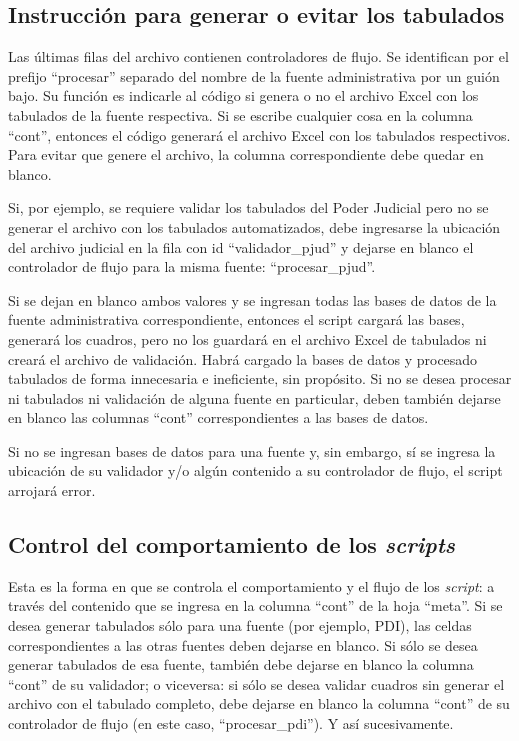 \documentclass[
  spanish,
]{book}
\begin{document}
\hypertarget{instrucciuxf3n-para-generar-o-evitar-los-tabulados}{%
\subsection{Instrucción para generar o evitar los tabulados}\label{instrucciuxf3n-para-generar-o-evitar-los-tabulados}}

Las últimas filas del archivo contienen controladores de flujo. Se identifican por el prefijo ``procesar'' separado del nombre de la fuente administrativa por un guión bajo. Su función es indicarle al código si genera o no el archivo Excel con los tabulados de la fuente respectiva. Si se escribe cualquier cosa en la columna ``cont'', entonces el código generará el archivo Excel con los tabulados respectivos. Para evitar que genere el archivo, la columna correspondiente debe quedar en blanco.

Si, por ejemplo, se requiere validar los tabulados del Poder Judicial pero no se generar el archivo con los tabulados automatizados, debe ingresarse la ubicación del archivo judicial en la fila con id ``validador\_pjud'' y dejarse en blanco el controlador de flujo para la misma fuente: ``procesar\_pjud''.

Si se dejan en blanco ambos valores y se ingresan todas las bases de datos de la fuente administrativa correspondiente, entonces el script cargará las bases, generará los cuadros, pero no los guardará en el archivo Excel de tabulados ni creará el archivo de validación. Habrá cargado la bases de datos y procesado tabulados de forma innecesaria e ineficiente, sin propósito. Si no se desea procesar ni tabulados ni validación de alguna fuente en particular, deben también dejarse en blanco las columnas ``cont'' correspondientes a las bases de datos.

Si no se ingresan bases de datos para una fuente y, sin embargo, sí se ingresa la ubicación de su validador y/o algún contenido a su controlador de flujo, el script arrojará error.

\hypertarget{control-del-comportamiento-de-los-scripts}{%
\subsection{\texorpdfstring{Control del comportamiento de los \emph{scripts}}{Control del comportamiento de los scripts}}\label{control-del-comportamiento-de-los-scripts}}

Esta es la forma en que se controla el comportamiento y el flujo de los \emph{script}: a través del contenido que se ingresa en la columna ``cont'' de la hoja ``meta''. Si se desea generar tabulados sólo para una fuente (por ejemplo, PDI), las celdas correspondientes a las otras fuentes deben dejarse en blanco. Si sólo se desea generar tabulados de esa fuente, también debe dejarse en blanco la columna ``cont'' de su validador; o viceversa: si sólo se desea validar cuadros sin generar el archivo con el tabulado completo, debe dejarse en blanco la columna ``cont'' de su controlador de flujo (en este caso, ``procesar\_pdi''). Y así sucesivamente.
\end{document}

